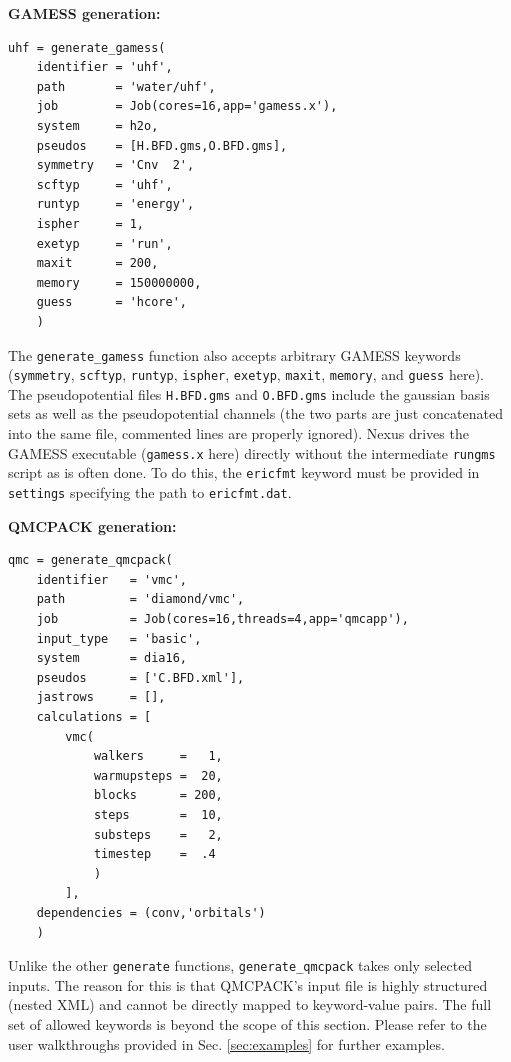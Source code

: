 \documentclass[oneside,11pt]{memoir}
\numberwithin{equation}{section}
\begin{document}
\vspace*{3mm}
\noindent
\textbf{GAMESS generation:}
\begin{verbatim}
uhf = generate_gamess(  
    identifier = 'uhf',
    path       = 'water/uhf',
    job        = Job(cores=16,app='gamess.x'),
    system     = h2o,
    pseudos    = [H.BFD.gms,O.BFD.gms],
    symmetry   = 'Cnv  2',
    scftyp     = 'uhf',
    runtyp     = 'energy',
    ispher     = 1,
    exetyp     = 'run',
    maxit      = 200,
    memory     = 150000000,
    guess      = 'hcore',
    )
\end{verbatim}

\noindent
The \texttt{generate\_gamess} function also accepts arbitrary GAMESS keywords (\texttt{symmetry}, \texttt{scftyp}, \texttt{runtyp}, \texttt{ispher}, \texttt{exetyp}, \texttt{maxit}, \texttt{memory}, and \texttt{guess} here).  The pseudopotential files \texttt{H.BFD.gms} and \texttt{O.BFD.gms} include the gaussian basis sets as well as the pseudopotential channels (the two parts are just concatenated into the same file, commented lines are properly ignored).  Nexus drives the GAMESS executable (\texttt{gamess.x} here) directly without the intermediate \texttt{rungms} script as is often done.  To do this, the \texttt{ericfmt} keyword must be provided in \texttt{settings} specifying the path to \texttt{ericfmt.dat}.    


\vspace*{3mm}
\noindent
\textbf{QMCPACK generation:}
\begin{verbatim}
qmc = generate_qmcpack(
    identifier   = 'vmc',
    path         = 'diamond/vmc',
    job          = Job(cores=16,threads=4,app='qmcapp'),
    input_type   = 'basic',
    system       = dia16,
    pseudos      = ['C.BFD.xml'],
    jastrows     = [],
    calculations = [
        vmc(
            walkers     =   1,
            warmupsteps =  20,
            blocks      = 200,
            steps       =  10,
            substeps    =   2,
            timestep    =  .4
            )
        ],
    dependencies = (conv,'orbitals')
    )
\end{verbatim}

\noindent
Unlike the other \texttt{generate} functions, \texttt{generate\_qmcpack} takes only selected inputs.  The reason for this is that QMCPACK's input file is highly structured (nested XML) and cannot be directly mapped to keyword-value pairs.  The full set of allowed keywords is beyond the scope of this section.  Please refer to the user walkthroughs provided in Sec. \ref{sec:examples} for further examples. 
\end{document}
